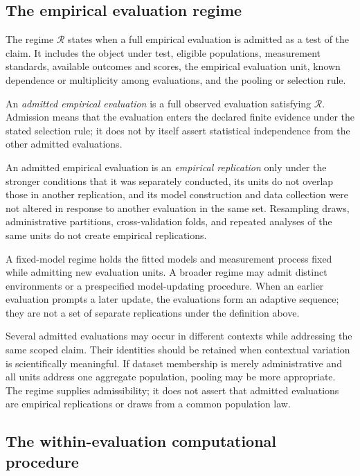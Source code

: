 \documentclass[11pt]{article}
\newcommand{\Regime}{\mathcal{R}}
\theoremstyle{remark}
\begin{document}
\subsection{The empirical evaluation regime}

The regime $\Regime$ states when a full empirical evaluation is admitted as a
test of the claim. It includes the object under test, eligible populations,
measurement standards, available outcomes and scores, the empirical
evaluation unit, known dependence or multiplicity among evaluations, and the
pooling or selection rule.

An \emph{admitted empirical evaluation} is a full observed evaluation
satisfying $\Regime$. Admission means that the evaluation enters the declared
finite evidence under the stated selection rule; it does not by itself assert
statistical independence from the other admitted evaluations.

An admitted empirical evaluation is an \emph{empirical replication} only
under the stronger conditions that it was separately conducted, its units do
not overlap those in another replication, and its model construction and data
collection were not altered in response to another evaluation in the same
set. Resampling draws, administrative partitions, cross-validation folds, and
repeated analyses of the same units do not create empirical replications.

A fixed-model regime holds the fitted models and measurement process fixed
while admitting new evaluation units. A broader regime may admit distinct
environments or a prespecified model-updating procedure. When an earlier
evaluation prompts a later update, the evaluations form an adaptive sequence;
they are not a set of separate replications under the definition above.

Several admitted evaluations may occur in different contexts while addressing
the same scoped claim. Their identities should be retained when contextual
variation is scientifically meaningful. If dataset membership is merely
administrative and all units address one aggregate population, pooling may be
more appropriate. The regime supplies admissibility; it does not assert that
admitted evaluations are empirical replications or draws from a common
population law.

\subsection{The within-evaluation computational procedure}
\end{document}
